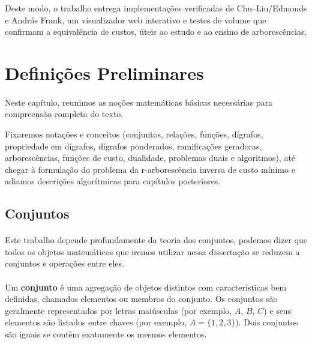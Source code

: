 \documentclass[12pt,a4paper]{article}
\begin{document}
Deste modo, o trabalho entrega implementações verificadas de Chu--Liu/Edmonds e András Frank, um visualizador web interativo e testes de volume que confirmam a equivalência de custos, úteis ao estudo e ao ensino de arborescências.

\section{Definições Preliminares}
\paragraph{}
Neste capítulo, reunimos as noções matemáticas básicas necessárias para compreensão completa do texto. 

Fixaremos notações e conceitos (conjuntos, relações, funções, dígrafos, propriedade em dígrafos, dígrafos ponderados, ramificações geradoras, arborescências, funções de custo, dualidade, problemas duais e algoritmos), até chegar à formulação do problema da r-arborescência inversa de custo mínimo e adiamos descrições algorítmicas para capítulos posteriores.

\subsection{Conjuntos}
\paragraph{}
Este trabalho depende profundamente da teoria dos conjuntos, podemos dizer que todos os objetos matemáticos que iremos utilizar nessa dissertação se reduzem a conjuntos e operações entre eles.

\paragraph{}
Um \textbf{conjunto} é uma agregação de objetos distintos com características bem definidas, chamados elementos ou membros do conjunto. Os conjuntos são geralmente representados por letras maiúsculas (por exemplo, \(A\), \(B\), \(C\)) e seus elementos são listados entre chaves (por exemplo, \(A = \{1, 2, 3\}\)). Dois conjuntos são iguais se contêm exatamente os mesmos elementos.
\end{document}
